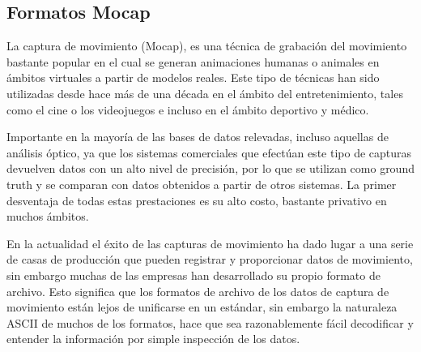 \subsection{Formatos Mocap}\label{formatos_MoCap}
La captura de movimiento (Mocap), es una técnica de grabación del movimiento bastante popular en el cual se generan animaciones humanas o animales en ámbitos virtuales a partir de modelos reales. Este tipo de técnicas han sido utilizadas desde hace más de una década en el ámbito del entretenimiento, tales como el cine o los videojuegos e incluso en el ámbito deportivo y médico. 


Importante en la mayoría de las bases de datos relevadas, incluso aquellas de análisis óptico, ya que los sistemas comerciales que efectúan este tipo de capturas devuelven datos con un alto nivel de precisión, por lo que se utilizan como ground truth y se comparan con datos obtenidos a partir de otros sistemas. La primer desventaja de todas estas prestaciones es su alto costo, bastante privativo en muchos ámbitos.

En la actualidad el éxito de las capturas de movimiento ha dado lugar a una serie de casas de producción que pueden registrar y proporcionar datos de movimiento, sin embargo muchas de las empresas han desarrollado su propio formato de archivo. Esto significa que los formatos de archivo de los datos de captura de movimiento
están lejos de unificarse en un estándar, sin embargo la naturaleza ASCII de muchos de los formatos, hace que sea razonablemente fácil decodificar y entender la información por simple inspección de los datos.

